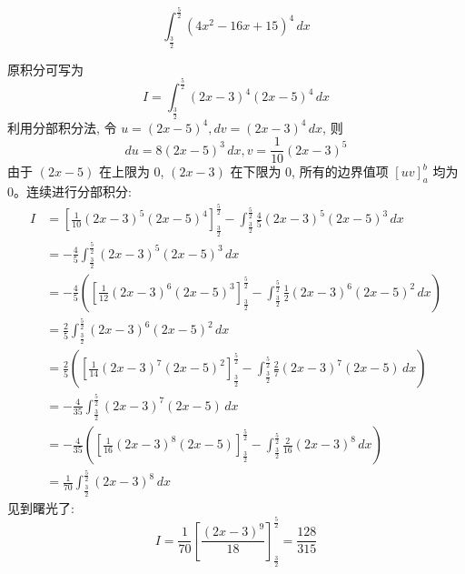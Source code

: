 \begin{questions}
    \question
    \[
    \int_{\frac{3}{2}}^{\frac{5}{2}} (4x^2-16x+15)^4 \,dx
    \]
    \begin{solution}
        原积分可写为
        \[
        I = \int_{\frac{3}{2}}^{\frac{5}{2}} (2x-3)^4(2x-5)^4 \,dx
        \]
        利用分部积分法, 令 $u = (2x-5)^4, dv = (2x-3)^4 \,dx$, 则 
        \[
        du = 8(2x-5)^3 \,dx, v = \frac{1}{10}(2x-3)^5
        \]
        由于 $(2x-5)$ 在上限为 $0$, $(2x-3)$ 在下限为 $0$, 所有的边界值项 $[uv]_a^b$ 均为 $0$。连续进行分部积分:
        \begin{align*}
        I &= \left[ \frac{1}{10}(2x-3)^5(2x-5)^4 \right]_{\frac{3}{2}}^{\frac{5}{2}} - \int_{\frac{3}{2}}^{\frac{5}{2}} \frac{4}{5}(2x-3)^5(2x-5)^3 \,dx \\
        &= -\frac{4}{5} \int_{\frac{3}{2}}^{\frac{5}{2}} (2x-3)^5(2x-5)^3 \,dx \\
        &= -\frac{4}{5} \left( \left[ \frac{1}{12}(2x-3)^6(2x-5)^3 \right]_{\frac{3}{2}}^{\frac{5}{2}} - \int_{\frac{3}{2}}^{\frac{5}{2}} \frac{1}{2}(2x-3)^6(2x-5)^2 \,dx \right) \\
        &= \frac{2}{5} \int_{\frac{3}{2}}^{\frac{5}{2}} (2x-3)^6(2x-5)^2 \,dx \\
        &= \frac{2}{5} \left( \left[ \frac{1}{14}(2x-3)^7(2x-5)^2 \right]_{\frac{3}{2}}^{\frac{5}{2}} - \int_{\frac{3}{2}}^{\frac{5}{2}} \frac{2}{7}(2x-3)^7(2x-5) \,dx \right) \\
        &= -\frac{4}{35} \int_{\frac{3}{2}}^{\frac{5}{2}} (2x-3)^7(2x-5) \,dx \\
        &= -\frac{4}{35} \left( \left[ \frac{1}{16}(2x-3)^8(2x-5) \right]_{\frac{3}{2}}^{\frac{5}{2}} - \int_{\frac{3}{2}}^{\frac{5}{2}} \frac{2}{16}(2x-3)^8 \,dx \right) \\
        &= \frac{1}{70} \int_{\frac{3}{2}}^{\frac{5}{2}} (2x-3)^8 \,dx
        \end{align*}
        见到曙光了:
        \[
        I = \frac{1}{70} \left[ \frac{(2x-3)^9}{18} \right]_{\frac{3}{2}}^{\frac{5}{2}} = \frac{128}{315}
        \]
    \end{solution}


\end{questions}
